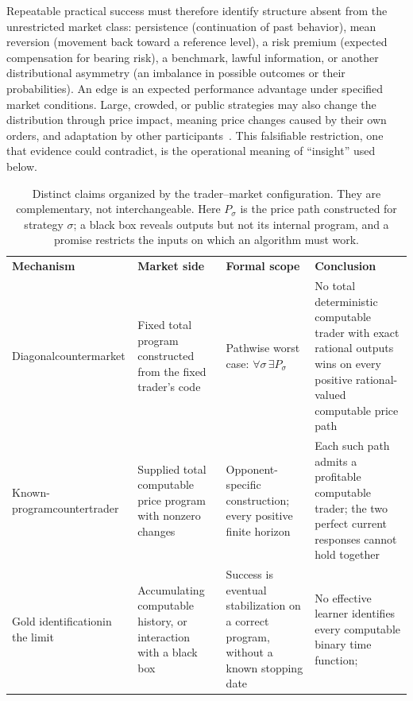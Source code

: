 \documentclass[aps,pra,reprint,superscriptaddress,amsmath,amssymb,floatfix]{revtex4-2}
\theoremstyle{plain}
\theoremstyle{definition}
\theoremstyle{remark}
\begin{document}
Repeatable practical success must therefore identify structure absent from the
unrestricted market class: persistence (continuation of past behavior), mean
reversion (movement back toward a reference level), a risk premium (expected
compensation for bearing risk), a benchmark, lawful information, or another
distributional asymmetry (an imbalance in possible outcomes or their
probabilities). An edge is an expected performance advantage under specified
market conditions. Large, crowded, or public strategies may also change the
distribution through price impact, meaning price changes caused by their own
orders, and adaptation by other participants~\cite{Lo2004}. This falsifiable restriction,
one that evidence could contradict, is the operational meaning of ``insight''
used below.

\begin{table}[t]
\caption{\label{tab:claimmap}Distinct claims organized by the trader--market
configuration. They are complementary, not interchangeable.
Here \(P_\sigma\) is the price path constructed for strategy \(\sigma\);
a black box reveals outputs but not its internal program, and a promise
restricts the inputs on which an algorithm must work.}
\centering
\begin{ruledtabular}
\begin{tabular}{p{}p{}p{}p{}}
\textbf{Mechanism} & \textbf{Market side} & \textbf{Formal scope}
& \textbf{Conclusion} \\
\colrule
Diagonal\newline\mbox{countermarket}
& Fixed total program constructed from the fixed trader's code
& Pathwise worst case:
\(\forall\sigma\,\exists P_\sigma\)
& No total deterministic computable trader with exact rational outputs wins
on every positive rational-valued computable price path \\
Known-program\newline countertrader
& Supplied total computable price program with nonzero changes
& Opponent-specific construction; every positive finite horizon
& Each such path admits a profitable computable trader; the two perfect
current responses cannot hold together \\
Gold identification\newline in the limit
& Accumulating computable history, or interaction with a black box
& Success is eventual stabilization on a correct program, without a known
stopping date
& No effective learner identifies every computable binary time function;

\end{tabular}
\end{ruledtabular}
\end{table}
\end{document}
